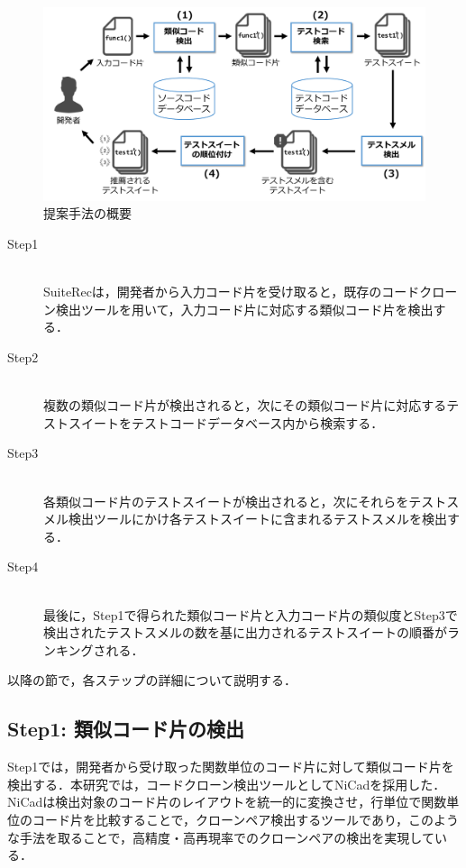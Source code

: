 \documentclass[12pt]{jarticle} %
\begin{document}
\begin{figure}[htbp]
  \begin{center}
    \includegraphics[clip,width=15cm]{pic/SuiteRec-outline.pdf}
    \caption{提案手法の概要}
    \label{SO}
  \end{center}
\end{figure}

\newpage
\begin{description}
\item[Step1]~\\
{\sf SuiteRec}は，開発者から入力コード片を受け取ると，既存のコードクローン検出ツールを用いて，入力コード片に対応する類似コード片を検出する．
\item[Step2]~\\
複数の類似コード片が検出されると，次にその類似コード片に対応するテストスイートをテストコードデータベース内から検索する．
\item[Step3]~\\
各類似コード片のテストスイートが検出されると，次にそれらをテストスメル検出ツールにかけ各テストスイートに含まれるテストスメルを検出する．
\item[Step4]~\\
最後に，Step1で得られた類似コード片と入力コード片の類似度とStep3で検出されたテストスメルの数を基に出力されるテストスイートの順番がランキングされる．
\end{description}

以降の節で，各ステップの詳細について説明する．

\subsection{Step1: 類似コード片の検出}

Step1では，開発者から受け取った関数単位のコード片に対して類似コード片を検出する．本研究では，コードクローン検出ツールとして{\sf NiCad}\cite{b2}を採用した．{\sf NiCad}は検出対象のコード片のレイアウトを統一的に変換させ，行単位で関数単位のコード片を比較することで，クローンペア検出するツールであり，このような手法を取ることで，高精度・高再現率でのクローンペアの検出を実現している．
\end{document}
